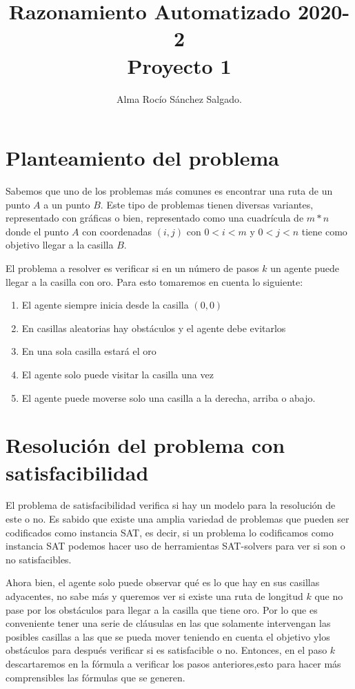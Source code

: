 \documentclass{article}
\title{
   	Razonamiento Automatizado 2020-2\\
    Proyecto 1
}
\author{
    Alma Rocío Sánchez Salgado.
}
\begin{document}
    \maketitle
    \section*{Planteamiento del problema}
    Sabemos que uno de los problemas más comunes es encontrar una ruta de un punto $A$ a un punto $B$. Este tipo de problemas tienen diversas variantes, representado con gráficas o bien, representado como una cuadrícula de $m*n$ donde el punto $A$ con coordenadas $(i,j)$ con $0 < i< m$ y $0< j < n$ tiene como objetivo llegar a la casilla $B$.
    
    El problema a resolver es verificar si en un número de pasos $k$ un agente puede llegar a la casilla con oro. Para esto tomaremos en cuenta lo siguiente: 
    \begin{enumerate}
    	\item El agente siempre inicia desde la casilla $(0,0)$
    	\item En casillas aleatorias hay obstáculos y el agente debe evitarlos 
    	\item En una sola casilla estará el oro
    	\item El agente solo puede visitar la casilla una vez 
    	\item El agente puede moverse solo una casilla a la derecha, arriba o abajo.
    \end{enumerate}
    \section*{Resolución del problema con satisfacibilidad}
    El problema de satisfacibilidad verifica si hay un modelo para la resolución de este o no. Es sabido que existe una amplia variedad de problemas que pueden ser codificados como instancia SAT, es decir, si un problema lo codificamos como instancia SAT podemos hacer uso de herramientas SAT-solvers para ver si son o no satisfacibles. 
    
    
    Ahora bien, el agente solo puede observar qué es lo que hay en sus casillas adyacentes, no sabe más y queremos 
    ver si existe una ruta de longitud $k$ que no pase por los obstáculos para llegar a la casilla que tiene oro. Por lo que es conveniente tener una serie de cláusulas en las que solamente intervengan las posibles casillas a las que se pueda mover teniendo en cuenta el objetivo ylos obstáculos para después verificar si es satisfacible o no. Entonces, en el paso $k$ descartaremos en la fórmula a verificar los pasos anteriores,esto para hacer más comprensibles las fórmulas que se generen. 
    
\end{document}
